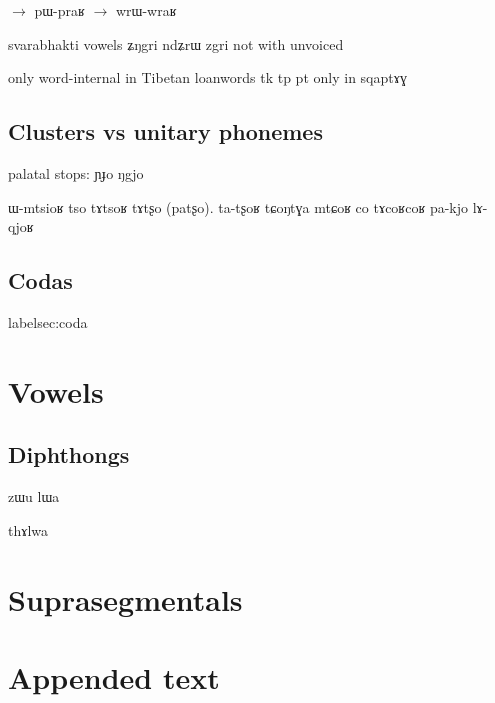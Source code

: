 \documentclass[oldfontcommands,oneside,a4paper,11pt]{article}
\newcommand{\ipa}[1]{{\phon #1}} %
\begin{document}
 \begin{exe}
\ex
\glt \ipa{praʁ} $\rightarrow$ \ipa{pɯ-praʁ}
\ex
\glt \ipa{wraʁ} $\rightarrow$ \ipa{wrɯ-wraʁ}
\end{exe}
  
  
  \citet{japhug14ideophones}
 
 
 
 svarabhakti vowels \ipa{ʑŋgri} \ipa{ndʑrɯ} \ipa{zgri} not with unvoiced
 
 
 
 
 only word-internal in Tibetan loanwords tk tp 
 pt only in \ipa{sqaptɤɣ}
 
 
      \subsection{Clusters vs unitary phonemes} \label{sec:non.clusters}
      
      
palatal stops:      
      \ipa{ɲɟo} \ipa{ŋgjo}
      
      ɯ-mtsioʁ
	tso tɤtsoʁ 
	tɤtʂo (patʂo). ta-tʂoʁ
 tɕoŋtɣa mtɕoʁ
 co tɤcoʁcoʁ
 pa-kjo
     lɤ-qjoʁ
      \subsection{Codas}label{sec:coda}
    
    
     \section{Vowels} \label{sec:vowels}
     
          \subsection{Diphthongs}
     zɯu
     lɯa
     
     thɤlwa
     
     \section{Suprasegmentals}
     
         
     \section{Appended text}


\end{document}
